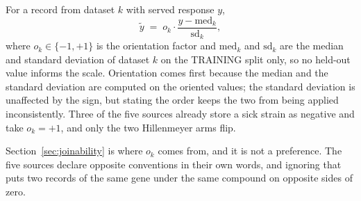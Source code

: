 For a record from dataset $k$ with served response $y$,
\[
  \tilde y \;=\; o_k \cdot \frac{y - \mathrm{med}_k}{\mathrm{sd}_k},
\]
where $o_k \in \{-1, +1\}$ is the orientation factor and $\mathrm{med}_k$ and $\mathrm{sd}_k$
are the median and standard deviation of dataset $k$ on the TRAINING split only, so no
held-out value informs the scale. Orientation comes first because the median and the standard
deviation are computed on the oriented values; the standard deviation is unaffected by the
sign, but stating the order keeps the two from being applied inconsistently. Three of the five
sources already store a sick strain as negative and take $o_k = +1$, and only the two
Hillenmeyer arms flip.

Section~\ref{sec:joinability} is where $o_k$ comes from, and it is not a preference. The five
sources declare opposite conventions in their own words, and ignoring that puts two records of
the same gene under the same compound on opposite sides of zero.
